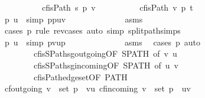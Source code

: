 \begin{isabellebody}
\ \ \ \ \ \ \ \ \ {}{\isacharcolon}\ {\isachardoublequoteopen}cf{\isachardot}isPath\ s\ p{}\ v{\isachardoublequoteclose}\isanewline
\ \ \ \ \ \ \ \ \ {}{\isacharcolon}\ {\isachardoublequoteopen}cf{\isachardot}isPath\ v\ p{}\ t{\isachardoublequoteclose}\ \isanewline
\ \ \ \ \ \ \ \ \isacommand{{\isachardot}}\isamarkupfalse%
\isanewline
\ \ \ \ \ \ \isamarkupfalse%
\ {}\ \isamarkupfalse%
\ p{}{\isacharprime}\ u{}\ \ {\isacharbrackleft}simp{\isacharbrackright}{\isacharcolon}\ {\isachardoublequoteopen}p{}{\isacharequal}p{}{\isacharprime}{\isacharat}{\isacharbrackleft}{\isacharparenleft}u{}{\isacharcomma}v{\isacharparenright}{\isacharbrackright}{\isachardoublequoteclose}\ \ \ \ \isanewline
\ \ \ \ \ \ \ \ \isamarkupfalse%
\ asm{\isacharunderscore}s\ \isamarkupfalse%
\ {\isacharparenleft}cases\ p{}\ rule{\isacharcolon}\ rev{\isacharunderscore}cases{\isacharparenright}\ {\isacharparenleft}auto\ simp{\isacharcolon}\ split{\isacharunderscore}path{\isacharunderscore}simps{\isacharparenright}\isanewline
\ \ \ \ \ \ \isamarkupfalse%
\ {}\ \isamarkupfalse%
\ p{}{\isacharprime}\ u{}\ \ {\isacharbrackleft}simp{\isacharbrackright}{\isacharcolon}\ {\isachardoublequoteopen}p{}{\isacharequal}{\isacharparenleft}v{\isacharcomma}u{}{\isacharparenright}{\isacharhash}p{}{\isacharprime}{\isachardoublequoteclose}\ \ \ \ \isanewline
\ \ \ \ \ \ \ \ \isamarkupfalse%
\ asm{\isacharunderscore}s\ \isamarkupfalse%
\ {\isacharparenleft}cases\ p{}{\isacharparenright}\ {\isacharparenleft}auto{\isacharparenright}\isanewline
\ \ \ \ \ \ \isamarkupfalse%
\ \isanewline
\ \ \ \ \ \ \ \ cf{\isachardot}isSPath{\isacharunderscore}sg{\isacharunderscore}outgoing{\isacharbrackleft}OF\ SPATH{\isacharcomma}\ of\ v\ u{}{\isacharbrackright}\ \ \isanewline
\ \ \ \ \ \ \ \ cf{\isachardot}isSPath{\isacharunderscore}sg{\isacharunderscore}incoming{\isacharbrackleft}OF\ SPATH{\isacharcomma}\ of\ u{}\ v{\isacharbrackright}\isanewline
\ \ \ \ \ \ \ \ cf{\isachardot}isPath{\isacharunderscore}edgeset{\isacharbrackleft}OF\ PATH{\isacharbrackright}\ \isanewline
\ \ \ \ \ \ \isamarkupfalse%
\ {\isachardoublequoteopen}cf{\isachardot}outgoing\ v\ {\isasyminter}\ set\ p\ {\isacharequal}\ {\isacharbraceleft}{\isacharparenleft}v{\isacharcomma}u{}{\isacharparenright}{\isacharbraceright}{\isachardoublequoteclose}\ {\isachardoublequoteopen}cf{\isachardot}incoming\ v\ {\isasyminter}\ set\ p\ {\isacharequal}\ {\isacharbraceleft}{\isacharparenleft}u{}{\isacharcomma}v{\isacharparenright}{\isacharbraceright}{\isachardoublequoteclose}\isanewline

\end{isabellebody}

